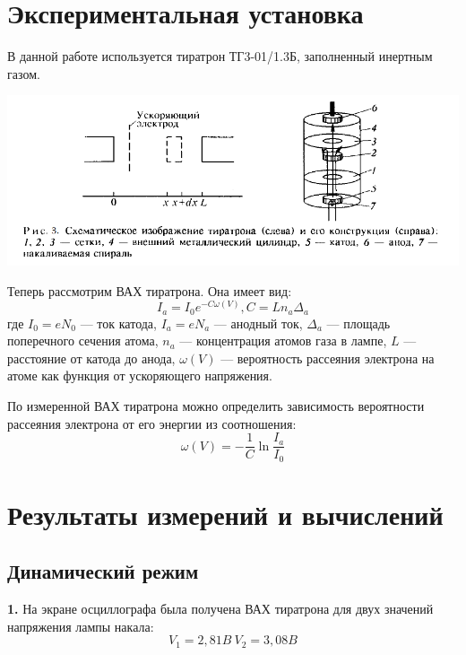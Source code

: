\documentclass[a4paper,12pt]{article}
\begin{document}
	\section{Экспериментальная установка}
	В данной работе используется тиратрон ТГ3-01/1.3Б, заполненный инертным газом.
	
	
	\includegraphics[height=10\baselineskip, width=\linewidth]{tira.png}
	
	Теперь рассмотрим ВАХ тиратрона. Она имеет вид:
	$$
	I_a = I_0e^{-C\omega(V)}, C = Ln_a\Delta_a
	$$
	где $I_0 = eN_0$ --- ток катода, $I_a = eN_a$ --- анодный ток, $\Delta_a$ --- площадь поперечного сечения атома, $n_a$ --- концентрация атомов газа в лампе, $L$ --- расстояние от катода до анода, $\omega(V)$ --- вероятность рассеяния электрона на атоме как функция от ускоряющего напряжения. 
	\newpage
	
	 По измеренной ВАХ тиратрона можно определить зависимость вероятности рассеяния электрона от его энергии из соотношения:
	\begin{equation}
	\omega(V) = -\frac{1}{C}\ln\frac{I_a}{I_0}
	\end{equation}
	
	\section{Результаты измерений и вычислений}
	\subsection{Динамический режим}
	{\bf 1.} На экране осциллографа была получена ВАХ тиратрона для двух значений напряжения лампы накала:
	$$V_1 = 2,81B\ V_2 = 3,08B$$
	
\end{document}
